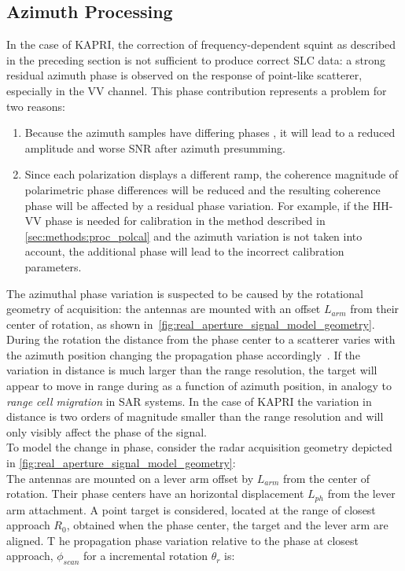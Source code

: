 \subsection{Azimuth Processing}\label{sec:methods:azimuth_processing}
In the case of KAPRI, the correction of frequency-dependent squint as described in the preceding section is not sufficient to produce correct SLC data: a strong residual  azimuth phase is observed on the response of point-like scatterer, especially in the VV channel. This phase contribution represents a problem for two reasons:
\begin{enumerate}
	\item Because the azimuth samples have differing phases
	, it will lead to a reduced amplitude and worse SNR after azimuth presumming. 
  \item Since each polarization displays a different ramp, the coherence magnitude of polarimetric phase differences will be reduced and the resulting coherence phase will be affected by a residual phase variation. For example, if the HH-VV phase is needed for calibration in the method described in \autoref{sec:methods:proc_polcal} and the azimuth variation is not taken into account, the additional phase will lead to the incorrect calibration parameters.\label{item:phase_variation}
\end{enumerate}
The azimuthal phase variation is suspected to be caused by the rotational geometry of acquisition: the antennas are mounted with an offset $L_{arm}$  from their center of rotation, as shown in~\autoref{fig:real_aperture_signal_model_geometry}. During the rotation the distance from the phase center to a scatterer varies with the azimuth position changing the propagation phase accordingly~\cite{Lee2014}. If the variation in distance is much larger than the range resolution, the target will appear to move in range during as a function of azimuth position, in analogy to \emph{range cell migration} in SAR systems. In the case of KAPRI the variation in distance is two orders of magnitude smaller than the range resolution and will only visibly affect the phase of the signal.\\
To model the change in phase, consider the radar acquisition geometry depicted in \autoref{fig:real_aperture_signal_model_geometry}:\\
The antennas are mounted on a lever arm offset by $L_{arm}$ from the center of rotation.
Their phase centers have an horizontal displacement $L_{ph}$ from the lever arm attachment.
A point target is considered, located at the  range of closest approach $R_0$, obtained when the phase center, the target and the lever arm are aligned.  T he propagation phase variation relative to the phase at closest approach, $\phi_{scan}$  for a incremental rotation  $\theta_r$  is:
